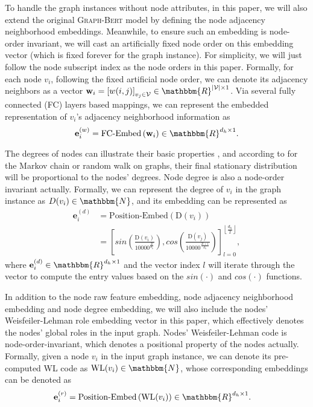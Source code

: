 \documentclass{article}
\newcommand{\mb}{\mathbf}
\newcommand{\mc}{\mathcal}
\newcommand{\gbert}{\textsc{Graph-Bert}}
\begin{document}
To handle the graph instances without node attributes, in this paper, we will also extend the original {\gbert} model by defining the node adjacency neighborhood embeddings. Meanwhile, to ensure such an embedding is node-order invariant, we will cast an artificially fixed node order on this embedding vector (which is fixed forever for the graph instance). For simplicity, we will just follow the node subscript index as the node orders in this paper. Formally, for each node $v_i$, following the fixed artificial node order, we can denote its adjacency neighbors as a vector $\mb{w}_i = \left[w(i,j)\right]_{v_j \in \mc{V}} \in \mathbbm{R}^{|\mc{V}| \times 1}$. Via several fully connected (FC) layers based mappings, we can represent the embedded representation of $v_i$'s adjacency neighborhood information as 
\begin{equation}
\mb{e}_i^{(w)} = \mbox{FC-Embed} \left( \mb{w}_i \right) \in \mathbbm{R}^{d_h \times 1}.
\end{equation}

The degrees of nodes can illustrate their basic properties \cite{Chung_Spectra_03,Bondy_Graph_76}, and according to \cite{Lovasz1996} for the Markov chain or random walk on graphs, their final stationary distribution will be proportional to the nodes' degrees. Node degree is also a node-order invariant actually. Formally, we can represent the degree of $v_i$ in the graph instance as $D(v_i) \in \mathbbm{N}$, and its embedding can be represented as 
\begin{equation}
\begin{aligned}
\mb{e}_i^{(d)} &= \mbox{Position-Embed}\left( \mbox{D}(v_i) \right)\\
&= \left[sin\left (\frac{\mbox{D}(v_i)}{10000^{\frac{2 l}{d_{h}}}} \right), cos\left(\frac{\mbox{D}(v_j)}{10000^{\frac{2 l + 1}{d_{h}}}} \right) \right]_{l=0}^{\left \lfloor \frac{d_h}{2} \right \rfloor},
\end{aligned}
\end{equation}
where $\mb{e}_i^{(d)} \in \mathbbm{R}^{d_h \times 1}$ and the vector index $l$ will iterate through the vector to compute the entry values based on the $sin(\cdot)$ and $cos(\cdot)$ functions.


In addition to the node raw feature embedding, node adjacency neighborhood embedding and node degree embedding, we will also include the nodes' Weisfeiler-Lehman role embedding vector in this paper, which effectively denotes the nodes' global roles in the input graph. Nodes' Weisfeiler-Lehman code is node-order-invariant, which denotes a positional property of the nodes actually. Formally, given a node $v_i$ in the input graph instance, we can denote its pre-computed WL code as $\mbox{WL}(v_i) \in \mathbbm{N}$, whose corresponding embeddings can be denoted as
\begin{equation}
\begin{aligned}
\mb{e}_i^{(r)} &= \mbox{Position-Embed}\left( \mbox{WL}(v_i) \right) \in \mathbbm{R}^{d_h \times 1}.
\end{aligned}
\end{equation}
\end{document}
